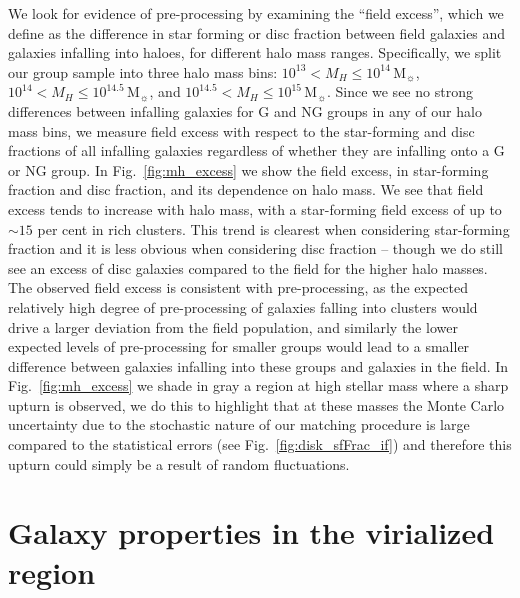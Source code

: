\documentclass[a4paper,fleqn,usenatbib]{mnras}
\newcommand{\Msun}{\,\mathrm{M_{\sun}}}
\begin{document}
We look for evidence of pre-processing by examining the ``field
excess'', which we define as the difference in star forming or disc
fraction between field galaxies and galaxies infalling into haloes,
for different halo mass ranges.  Specifically, we split our group
sample into three halo mass bins: $10^{13} < M_H \le 10^{14}\Msun$,
  $10^{14} < M_H \le 10^{14.5}\Msun$, and $10^{14.5} < M_H \le
  10^{15}\Msun$.  Since we see no strong
differences between infalling galaxies for G and NG groups in any of
our halo mass bins, we measure field excess with
respect to the star-forming and
disc fractions of all infalling galaxies regardless of whether they
are infalling onto a G or NG group.  In Fig.~\ref{fig:mh_excess}  we show
the field excess, in star-forming fraction and disc
fraction, and its dependence on halo mass.  We see that field excess
tends to increase with halo mass, with a star-forming field excess of
up to $\sim\!15$ per cent in rich clusters.  This trend is clearest when
considering star-forming fraction and it is less obvious when
considering disc fraction -- though we do still 
see an excess of disc galaxies compared to the field for the higher
halo masses.  The observed field excess is consistent with pre-processing, as
the expected relatively high degree of pre-processing of galaxies falling into
clusters would drive a larger deviation from the field population, and
similarly the lower expected levels of pre-processing for smaller
groups would lead to a smaller difference between galaxies infalling into
these groups and galaxies in the field.  In Fig.~\ref{fig:mh_excess}
we shade in gray a region at high stellar mass where a sharp upturn is
observed, we do this to highlight that at these masses the Monte Carlo
uncertainty due to the stochastic nature of our matching procedure is
large compared to the statistical errors (see
Fig.~\ref{fig:disk_sfFrac_if}) and therefore this upturn could simply
be a result of random fluctuations.


\section{Galaxy properties in the virialized region}
\label{sec:virial}
\end{document}
